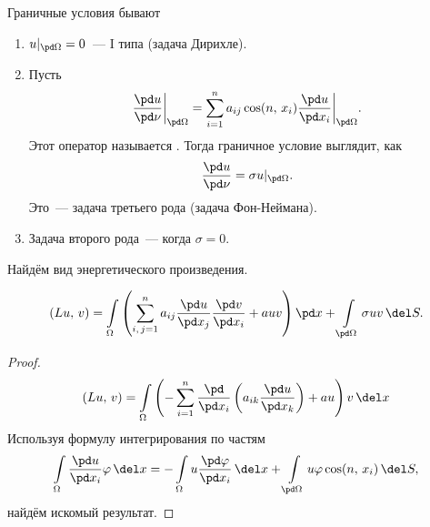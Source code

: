 \documentclass{trlnotes}
\begin{document}
    Граничные условия бывают
    \begin{enumerate}
        \item $u|_{\pd\Omega} = 0$~--- I типа (задача Дирихле).
        \item Пусть
        \[
            \dfrac{\pd u}{\pd \nu} \bigg|_{\pd \Omega} = \sum\limits_{i = 1}^n a_{ij} \cos(n, \, x_i) \dfrac{\pd u}{\pd x_i} \bigg|_{\pd \Omega}.
        \]
        Этот оператор называется .
        Тогда граничное условие выглядит, как
        \[
            \dfrac{\pd u}{\pd \nu} = \sigma u|_{\pd \Omega}.
        \]
        Это~--- задача третьего рода (задача Фон-Неймана).
        \item Задача второго рода~--- когда $\sigma = 0$.
    \end{enumerate}

    Найдём вид энергетического произведения.

    \begin{st}
        \[
            (Lu, \, v) = \int\limits_{\Omega} \left(\sum\limits_{i, \, j = 1}^n a_{ij} \dfrac{\pd u}{\pd x_j} \dfrac{\pd v}{\pd x_i} + auv\right) \pd x + \int\limits_{\pd \Omega} \sigma u v \, \del S.
        \]
        \begin{proof}
            \[
                (Lu, \, v) = \int\limits_{\Omega}  \left( - \sum\limits_{i = 1}^n \dfrac{\pd}{\pd x_i}\left(a_{ik} \dfrac{\pd u}{\pd x_k}\right) + au \right) v \, \del x
            \]
            Используя формулу интегрирования по частям
            \[
                \int\limits_{\Omega} \dfrac{\pd u}{\pd x_i} \varphi \, \del x = - \int\limits_{\Omega} u  \dfrac{\pd \varphi}{\pd x_i} \, \del x + \int\limits_{\pd \Omega} u\varphi \cos(n, \, x_i) \, \del S,
            \]
            найдём искомый результат.
        \end{proof}
    \end{st}
\end{document}
